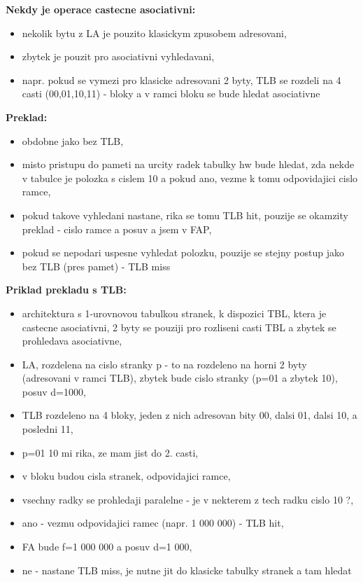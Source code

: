 \documentclass[a4paper, 11pt]{article}
\begin{document}
\textbf{Nekdy je operace castecne asociativni:}
\begin{itemize}
    \item nekolik bytu z LA je pouzito klasickym zpusobem adresovani,
    \item zbytek je pouzit pro asociativni vyhledavani,
    \item napr. pokud se vymezi pro klasicke adresovani 2 byty, TLB se rozdeli na 4 casti (00,01,10,11) - bloky a v ramci bloku se bude hledat asociativne \\
\end{itemize}

\textbf{Preklad:}
\begin{itemize}
    \item obdobne jako bez TLB,
    \item misto pristupu do pameti na urcity radek tabulky hw bude hledat, zda nekde v tabulce je polozka s cislem 10 a pokud ano, vezme k tomu odpovidajici cislo ramce,
    \item pokud takove vyhledani nastane, rika se tomu TLB hit, pouzije se okamzity preklad - cislo ramce a posuv a jsem v FAP,
    \item pokud se nepodari uspesne vyhledat polozku, pouzije se stejny postup jako bez TLB (pres pamet) - TLB miss \\
\end{itemize}

\textbf{Priklad prekladu s TLB:}
\begin{itemize}
    \item architektura s 1-urovnovou tabulkou stranek, k dispozici TBL, ktera je castecne asociativni, 2 byty se pouziji pro rozliseni casti TBL a zbytek se prohledava asociativne,
    \item LA, rozdelena na cislo stranky p - to na rozdeleno na horni 2 byty (adresovani v ramci TLB), zbytek bude cislo stranky (p=01 a zbytek 10), posuv d=1000,
    \item TLB rozdeleno na 4 bloky, jeden z nich adresovan bity 00, dalsi 01, dalsi 10, a posledni 11,
    \item p=01 10 mi rika, ze mam jist do 2. casti,
    \item v bloku budou cisla stranek, odpovidajici ramce,
    \item vsechny radky se prohledaji paralelne - je v nekterem z tech radku cislo 10 ?,
    \item ano - vezmu odpovidajici ramec (napr. 1 000 000) - TLB hit,
    \item FA bude f=1 000 000 a posuv d=1 000,
    \item ne - nastane TLB miss, je nutne jit do klasicke tabulky stranek a tam hledat \\
\end{itemize}
\end{document}
